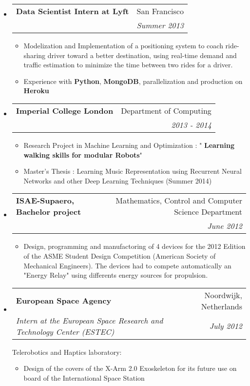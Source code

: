 \documentclass[letterpaper,11pt]{article}
\makeatletter
\newcommand{\resitem}[1]{\item #1 \vspace{-2pt}}
\newcommand{\ressubheading}[4]{
\begin{tabular*}{6.5in}{l@{\cftdotfill{\cftsecdotsep}\extracolsep{\fill}}r}
		\textbf{#1} & #2 \\
		\textit{#3} & \textit{#4} \\
\end{tabular*}\vspace{-6pt}}
\makeatother
\begin{document}
\begin{itemize}
    \item
\ressubheading{Data Scientist Intern at Lyft}{San Francisco}{}{Summer 2013}
    \begin{itemize}
        \item Modelization and Implementation of a positioning system to coach ride-sharing driver toward a better destination, using real-time demand and traffic estimation to minimize the time between two rides for a driver.
        \item Experience with \textbf{Python}, \textbf{MongoDB}, parallelization and production on \textbf{Heroku}
    \end{itemize}


    \item
\ressubheading{Imperial College London}{Department of Computing}{}{2013 - 2014}
    \begin{itemize}

        \item Research Project in Machine Learning and Optimization : " \textbf{Learning walking skills for modular Robots}"
        \item Master's Thesis : Learning Music Representation using Recurrent Neural Networks and other Deep Learning Techniques (Summer 2014)
    \end{itemize}



\item
	\ressubheading{ISAE-Supaero, Bachelor project}{Mathematics, Control and Computer Science Department}{}{June 2012}
		\begin{itemize}
\item Design, programming and manufactoring of 4 devices for the 2012 Edition of the ASME Student Design Competition (American Society of Mechanical Engineers). The devices had to compete automatically an "Energy Relay" using differents energy sources for propulsion.
	\end{itemize}


\item
	\ressubheading{European Space Agency}{Noordwijk, Netherlands}{ Intern at the European Space Research and Technology Center (ESTEC)}{July 2012}
\vspace{0.2cm}

Telerobotics and Haptics laboratory:
	\begin{itemize}
		\resitem{Design of the covers of the X-Arm 2.0 Exoskeleton for its future use on board of the International Space Station }
	\end{itemize}
\end{itemize}
\end{document}
